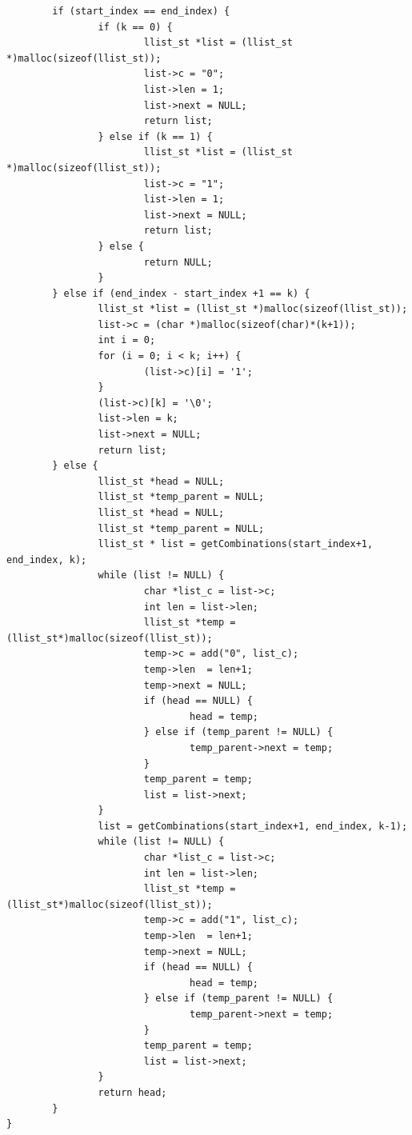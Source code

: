 \documentclass[11pt]{article}
\begin{document}
\begin{lstlisting}
        if (start_index == end_index) {
                if (k == 0) {
                        llist_st *list = (llist_st *)malloc(sizeof(llist_st));
                        list->c = "0";
                        list->len = 1;
                        list->next = NULL;
                        return list;
                } else if (k == 1) {
                        llist_st *list = (llist_st *)malloc(sizeof(llist_st));
                        list->c = "1";
                        list->len = 1;
                        list->next = NULL;
                        return list;
                } else {
                        return NULL;
                }
        } else if (end_index - start_index +1 == k) {
                llist_st *list = (llist_st *)malloc(sizeof(llist_st));
                list->c = (char *)malloc(sizeof(char)*(k+1));
                int i = 0;
                for (i = 0; i < k; i++) {
                        (list->c)[i] = '1';
                }
                (list->c)[k] = '\0';
                list->len = k;
                list->next = NULL;
                return list;
        } else {
                llist_st *head = NULL;
                llist_st *temp_parent = NULL;
                llist_st *head = NULL;
                llist_st *temp_parent = NULL;
                llist_st * list = getCombinations(start_index+1, end_index, k);
                while (list != NULL) {
                        char *list_c = list->c;
                        int len = list->len;
                        llist_st *temp = (llist_st*)malloc(sizeof(llist_st));
                        temp->c = add("0", list_c);
                        temp->len  = len+1;
                        temp->next = NULL;
                        if (head == NULL) {
                                head = temp;
                        } else if (temp_parent != NULL) {
                                temp_parent->next = temp;
                        }
                        temp_parent = temp;
                        list = list->next;
                }
                list = getCombinations(start_index+1, end_index, k-1);
                while (list != NULL) {
                        char *list_c = list->c;
                        int len = list->len;
                        llist_st *temp = (llist_st*)malloc(sizeof(llist_st));
                        temp->c = add("1", list_c);
                        temp->len  = len+1;
                        temp->next = NULL;
                        if (head == NULL) {
                                head = temp;
                        } else if (temp_parent != NULL) {
                                temp_parent->next = temp;
                        }
                        temp_parent = temp;
                        list = list->next;
                }
                return head;
        }
}


\end{lstlisting}
\end{document}
